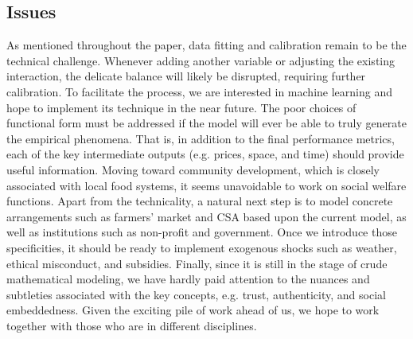 \documentclass[11pt, oneside]{article}
\begin{document}
\subsection{Issues}
As mentioned throughout the paper, data fitting and calibration remain to be the technical challenge. Whenever adding another variable or adjusting the existing interaction, the delicate balance will likely be disrupted, requiring further calibration. To facilitate the process, we are interested in machine learning and hope to implement its technique in the near future. The poor choices of functional form must be addressed if the model will ever be able to truly generate the empirical phenomena. That is, in addition to the final performance metrics, each of the key intermediate outputs (e.g. prices, space, and time) should provide useful information. Moving toward community development, which is closely associated with local food systems, it seems unavoidable to work on social welfare functions. Apart from the technicality, a natural next step is to model concrete arrangements such as farmers' market and CSA based upon the current model, as well as institutions such as non-profit and government. Once we introduce those specificities, it should be ready to implement exogenous shocks such as weather, ethical misconduct, and subsidies. Finally, since it is still in the stage of crude mathematical modeling, we have hardly paid attention to the nuances and subtleties associated with the key concepts, e.g. trust, authenticity, and social embeddedness. Given the exciting pile of work ahead of us, we hope to work together with those who are in different disciplines.


\vspace{5mm}

\printbibliography[heading=bibintoc]
\end{document}
